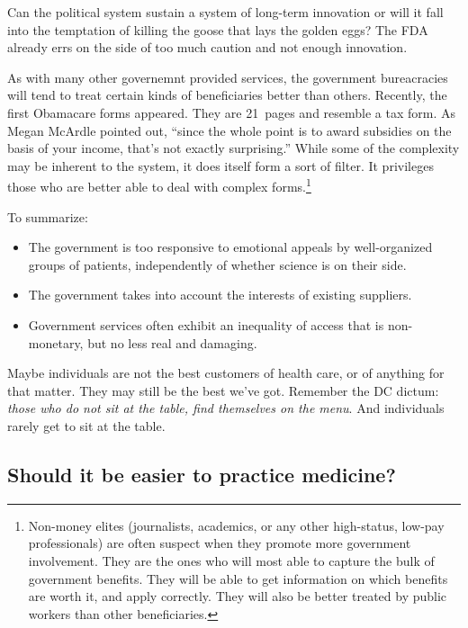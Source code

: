 Can the political system sustain a system of long-term innovation or will it
fall into the temptation of killing the goose that lays the golden eggs? The
FDA already errs on the side of too much caution and not enough innovation.

As with many other governemnt provided services, the government bureacracies
will tend to treat certain kinds of beneficiaries better than others.
Recently, the first Obamacare forms appeared. They are 21~pages and resemble a
tax form. As Megan McArdle pointed out, ``since the whole point is to award
subsidies on the basis of your income, that's not exactly
surprising.''
While some of the complexity may be inherent to the system, it does itself form
a sort of filter. It privileges those who are better able to deal with complex
forms.\footnote{Non-money elites (journalists, academics, or any other
high-status, low-pay professionals) are often suspect when they promote more
government involvement. They are the ones who will most able to capture the
bulk of government benefits. They will be able to get information on which
benefits are worth it, and apply correctly. They will also be better treated by
public workers than other beneficiaries.}

To summarize:
\begin{itemize}
\item The government is too responsive to emotional appeals by well-organized
groups of patients, independently of whether science is on their side.
\item The government takes into account the interests of existing suppliers.
\item Government services often exhibit an inequality of access that is
non-monetary, but no less real and damaging.
\end{itemize}

Maybe individuals are not the best customers of health care, or of anything for
that matter. They may still be the best we've got. Remember the DC dictum:
\emph{those who do not sit at the table, find themselves on the menu}. And
individuals rarely get to sit at the table.

\subsection{Should it be easier to practice medicine?}

